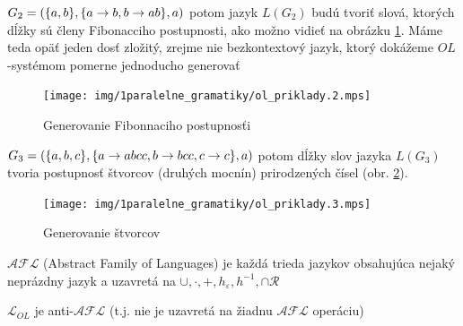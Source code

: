 \begin{priklad}
$G_{2}=(\{a,b\},\{a\rightarrow b,b\rightarrow ab\},a)$ potom jazyk $L(G_{2})$ budú
tvoriť slová, ktorých dĺžky sú členy Fibonacciho postupnosti, ako
možno vidieť na obrázku \ref{img:ol_priklad_2}. Máme teda
opäť jeden dosť zložitý, zrejme nie bezkontextový jazyk,
ktorý dokážeme $OL$-systémom pomerne jednoducho generovať
\end{priklad}

\begin{figure}[htp]
    \centering
    \texttt{[image: img/1paralelne\_gramatiky/ol\_priklady.2.mps]}
    \caption{Generovanie Fibonnaciho postupnosťi}
    \label{img:ol_priklad_2}
\end{figure}

\begin{priklad}
$G_{3}=(\{a,b,c\},\{a\rightarrow abcc,b\rightarrow bcc,c\rightarrow c\},a)$ potom dĺžky
slov jazyka $L(G_{3})$ tvoria postupnosť štvorcov (druhých mocnín)
prirodzených čísel (obr. \ref{img:ol_priklad_3}).
\end{priklad}

\begin{figure}[htp]
    \centering
    \texttt{[image: img/1paralelne\_gramatiky/ol\_priklady.3.mps]}
    \caption{Generovanie štvorcov}
    \label{img:ol_priklad_3}
\end{figure}

\begin{definicia}
$\mathcal{AFL}$ (Abstract Family of Languages) je každá trieda
jazykov obsahujúca nejaký neprázdny jazyk a uzavretá na
$\cup,\cdot,+,h_{\varepsilon},h^{-1},\cap\mathcal{R}$
\end{definicia}

\begin{veta}
$\mathcal{L}_{OL}$ je anti-$\mathcal{AFL}$ (t.j. nie je uzavretá
na žiadnu $\mathcal{AFL}$ operáciu)
\end{veta}


